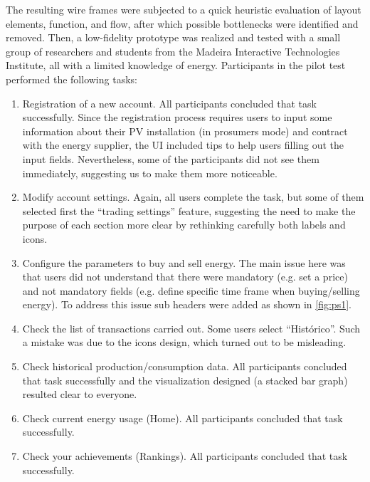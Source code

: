 The resulting wire frames were subjected to a quick heuristic evaluation of layout elements, function, and flow, after which possible bottlenecks were identified and removed. Then, a low-fidelity prototype was realized and tested with a small group of researchers and students from the Madeira Interactive Technologies Institute, all with a limited knowledge of energy.
Participants in the pilot test performed the following tasks:
\begin{enumerate}
    \item Registration of a new account. All participants concluded that task successfully. Since the registration process requires users to input some information about their \ac{PV} installation (in prosumers mode) and contract with the energy supplier, the \ac{UI} included tips to help users filling out the input fields. Nevertheless, some of the participants did not see them immediately, suggesting us to make them more noticeable. 
    \item Modify account settings. Again, all users complete the task, but some of them selected first the “trading settings” feature, suggesting the need to make the purpose of each section more clear by rethinking carefully both labels and icons.
    \item Configure the parameters to buy and sell energy. The main issue here was that users did not understand that there were mandatory (e.g. set a price) and not mandatory fields (e.g. define specific time frame when buying/selling energy). To address this issue sub headers were added as shown in \cref{fig:ps1}.
    \item Check the list of transactions carried out. Some users select “Histórico”. Such a mistake was due to the icons design, which turned out to be misleading.
    \item Check historical production/consumption data. All participants concluded that task successfully and the visualization designed (a stacked bar graph) resulted clear to everyone.
    \item Check current energy usage (Home). All participants concluded that task successfully.
    \item Check your achievements (Rankings). All participants concluded that task successfully.
\end{enumerate}


